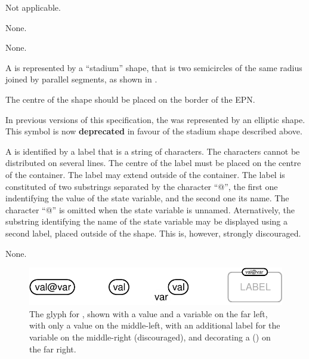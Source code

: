 \begin{glyphDescription}

\glyphSboTerm
Not applicable.

\glyphIncoming
None.

\glyphOutgoing
None.

\glyphContainer
A  is represented by a ``stadium'' shape, that is two semicircles of the same radius joined by parallel segments, as shown in .

The centre of the shape should be placed on the border of the EPN.

In previous versions of this specification, the  was represented by an elliptic shape.
This symbol is now \textbf{deprecated} in favour of the stadium shape described above.

\glyphLabel
A  is identified by a label that is  a string of characters.
The characters cannot be distributed on several lines.
The centre of the label must be placed on the centre of the container.
The label may extend outside of the container.
The label is constituted of two substrings separated by the character ``@'', the first one indentifying the value of the state variable, and the second one its name.
The character ``@'' is omitted when the state variable is unnamed.
Aternatively, the substring identifying the name of the state variable may be displayed using a second label, placed outside of the shape.
This is, however, strongly discouraged.

\glyphAux
None.

\end{glyphDescription}

\begin{figure}[H]
  \centering
  \includegraphics{images/build/state_variable.pdf}
  \caption{The \PD glyph for , shown with a value and a variable on the far left, with only a value on the middle-left, with an additional label for the variable on the middle-right (discouraged), and decorating a  () on the far right.}
  \label{fig:state-var}
\end{figure}


